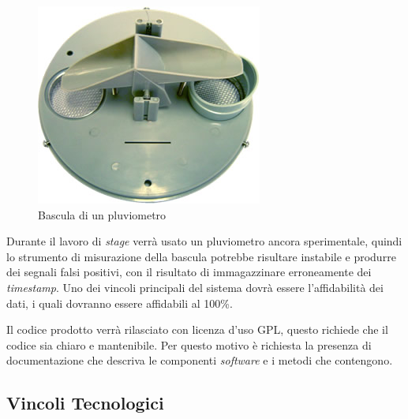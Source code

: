 \begin{figure}[htpb]
\centering
\includegraphics[scale=.4]{./capitoli/capitolo2/img/bascula}
\caption{Bascula di un pluviometro}

\end{figure}


Durante il lavoro di \textit{stage} verrà usato un pluviometro ancora sperimentale, quindi lo strumento di misurazione della bascula potrebbe risultare instabile e produrre dei segnali falsi positivi, con il risultato di immagazzinare erroneamente dei \textit{timestamp}. Uno dei vincoli principali del sistema dovrà essere l'affidabilità dei dati, i quali dovranno essere affidabili al 100\%. 

Il codice prodotto verrà rilasciato con licenza d'uso GPL, questo richiede che il codice sia chiaro e mantenibile. Per questo motivo è richiesta la presenza di documentazione che descriva le componenti \textit{software} e i metodi che contengono.

\subsection{Vincoli Tecnologici}


